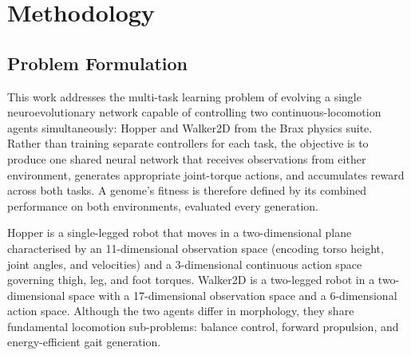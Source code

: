 \documentclass[12pt]{article}
\begin{document}


\section{Methodology}

\subsection{Problem Formulation}

This work addresses the multi-task learning problem of evolving a single neuroevolutionary network capable of controlling two continuous-locomotion agents simultaneously: Hopper and Walker2D from the Brax physics suite. Rather than training separate controllers for each task, the objective is to produce one shared neural network that receives observations from either environment, generates appropriate joint-torque actions, and accumulates reward across both tasks. A genome's fitness is therefore defined by its combined performance on both environments, evaluated every generation.

Hopper is a single-legged robot that moves in a two-dimensional plane characterised by an 11-dimensional observation space (encoding torso height, joint angles, and velocities) and a 3-dimensional continuous action space governing thigh, leg, and foot torques. Walker2D is a two-legged robot in a two-dimensional space with a 17-dimensional observation space and a 6-dimensional action space. Although the two agents differ in morphology, they share fundamental locomotion sub-problems: balance control, forward propulsion, and energy-efficient gait generation.
\end{document}
